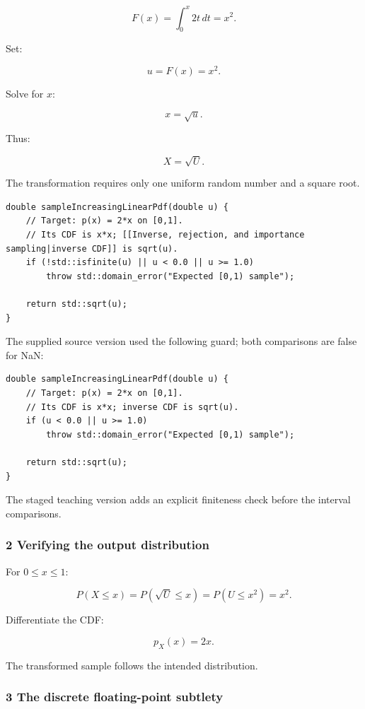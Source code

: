 \[
 F(x)=\int_0^x2t\,dt=x^2.
\]

Set:

\[
 u=F(x)=x^2.
\]

Solve for \(x\):

\[
 \boxed{x=\sqrt u}.
\]

Thus:

\[
 \boxed{X=\sqrt U}.
\]

The transformation requires only one uniform random number and a square root.

\begin{verbatim}
double sampleIncreasingLinearPdf(double u) {
    // Target: p(x) = 2*x on [0,1].
    // Its CDF is x*x; [[Inverse, rejection, and importance sampling|inverse CDF]] is sqrt(u).
    if (!std::isfinite(u) || u < 0.0 || u >= 1.0)
        throw std::domain_error("Expected [0,1) sample");

    return std::sqrt(u);
}
\end{verbatim}

The supplied source version used the following guard; both comparisons are false for NaN:

\begin{verbatim}
double sampleIncreasingLinearPdf(double u) {
    // Target: p(x) = 2*x on [0,1].
    // Its CDF is x*x; inverse CDF is sqrt(u).
    if (u < 0.0 || u >= 1.0)
        throw std::domain_error("Expected [0,1) sample");

    return std::sqrt(u);
}
\end{verbatim}

The staged teaching version adds an explicit finiteness check before the interval comparisons.

\subsubsection{2 Verifying the output distribution}\label{02-foundations-ii-ch029-verifying-the-output-distribution}

For \(0\le x\le1\):

\[
 P(X\le x) = P(\sqrt U\le x) = P(U\le x^2) =x^2.
\]

Differentiate the CDF:

\[
 p_X(x)=2x.
\]

The transformed sample follows the intended distribution.

\subsubsection{3 The discrete floating-point subtlety}\label{02-foundations-ii-ch029-the-discrete-floating-point-subtlety}

